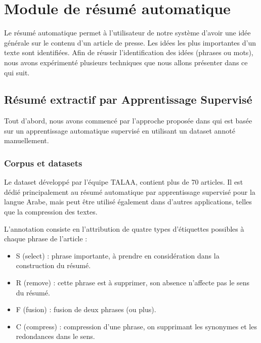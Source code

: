 \section{Module de résumé automatique}
Le résumé automatique permet à l'utilisateur de notre système d'avoir une idée générale sur le contenu d'un article de presse. Les idées les plus importantes d'un texte sont identifiées. Afin de réussir l'identification des idées (phrases ou mots), nous avons expérimenté plusieurs techniques que nous allons présenter dans ce qui suit.

    \subsection{Résumé extractif par Apprentissage Supervisé}
    Tout d'abord, nous avons commencé par l'approche proposée dans \cite{riad-belkbir} qui est basée sur un apprentissage automatique supervisé en utilisant un dataset annoté manuellement. 
        \subsubsection{Corpus et datasets}
        Le dataset développé par l'équipe TALAA, contient plus de 70 articles. Il est dédié principalement au résumé automatique par apprentissage supervisé pour la langue Arabe, mais peut être utilisé également dans d'autres applications, telles que la compression des textes.

        L'annotation consiste en l'attribution de quatre types d'étiquettes possibles à chaque phrase de l'article :
            \begin{itemize}
                \item S (select) : phrase importante, à prendre en considération dans la construction du résumé.
                \item R (remove) : cette phrase est à supprimer, son absence n'affecte pas le sens du résumé.
                \item F (fusion) : fusion de deux phrases (ou plus).
                \item C (compress) : compression d'une phrase, on supprimant les synonymes et les redondances dans le sens.\\
            \end{itemize}

